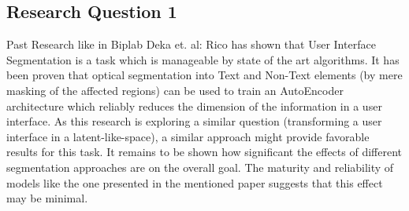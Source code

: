 \documentclass[10pt,a4paper]{scrartcl} %
\begin{document}
\subsection{Research Question 1}
%
Past Research like in Biplab Deka et. al: Rico \cite{10.1145/3126594.3126651} has shown that User Interface Segmentation is a task which is manageable by state of the art algorithms. It has been proven that optical segmentation into Text and Non-Text elements (by mere masking of the affected regions) can be used to train an AutoEncoder architecture which reliably reduces the dimension 
of the information in a user interface. As this research is exploring a similar question (transforming a user interface in a latent-like-space), a similar approach might provide favorable results for this task.
It remains to be shown how significant the effects of different segmentation approaches are on the overall goal. The maturity and reliability of models like the one presented in the mentioned paper suggests that this effect may be minimal.
\end{document}
